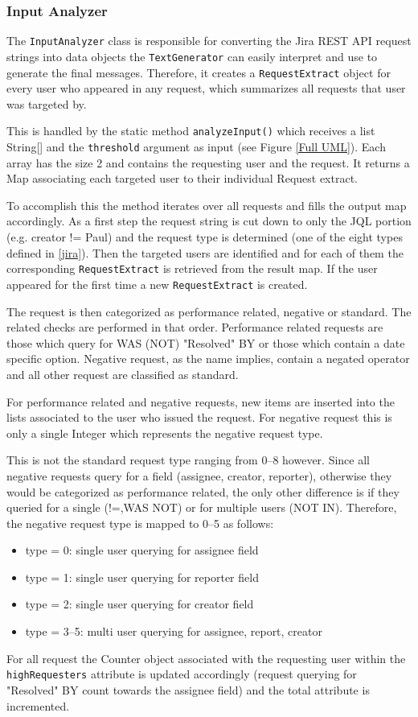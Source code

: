 \documentclass[sigconf,obeyspaces]{acmart}
\begin{document}
\subsubsection{Input Analyzer}\label{input}
The \texttt{InputAnalyzer} class is responsible for converting the Jira REST API request strings into data objects the \texttt{TextGenerator} can easily interpret and use to generate the final messages. Therefore, it creates a \texttt{RequestExtract} object for every user who appeared in any request, which summarizes all requests that user was targeted by.

This is handled by the static method \texttt{analyzeInput()} which receives a list String[] and the \texttt{threshold} argument as input (see Figure \ref{Full UML}). Each array has the size 2 and contains the requesting user and the request. It returns a Map associating each targeted user to their individual Request extract.

To accomplish this the method iterates over all requests and fills the output map accordingly. As a first step the request string is cut down to only the JQL portion (e.g. creator !=  Paul) and the request type is determined (one of the eight types defined in \ref{jira}). Then the targeted users are identified and for each of them the corresponding \texttt{RequestExtract} is retrieved from the result map. If the user appeared for the first time a new \texttt{RequestExtract} is created.

The request is then categorized as performance related, negative or standard. The related checks are performed in that order. Performance related requests are those which query for WAS (NOT) "Resolved" BY or those which contain a date specific option. Negative request, as the name implies, contain a negated operator and all other request are classified as standard.

For performance related and negative requests, new items are inserted into the lists associated to the user who issued the request. For negative request this is only a single Integer which represents the negative request type. 

This is not the standard request type ranging from 0--8 however. Since all negative requests query for a field (assignee, creator, reporter), otherwise they would be categorized as performance related, the only other difference is if they queried for a single (!=,WAS NOT) or for multiple users (NOT IN). Therefore, the negative request type is mapped to 0--5 as follows:
\begin{itemize}
    \item type = 0: single user querying for assignee field
    \item type = 1: single user querying for reporter field
    \item type = 2: single user querying for creator field
    \item type = 3--5: multi user querying for assignee, report, creator
\end{itemize}
For all request the Counter object associated with the requesting user within the \texttt{highRequesters} attribute is updated accordingly (request querying for "Resolved" BY count towards the assignee field) and the total attribute is incremented.
\end{document}
